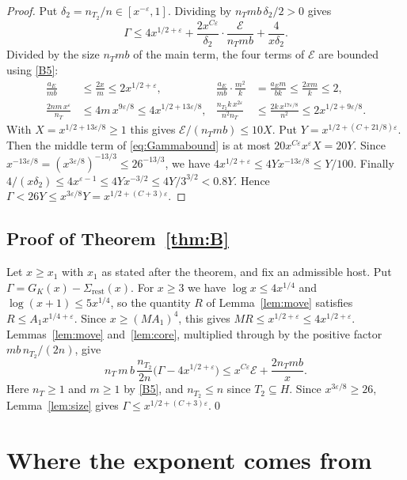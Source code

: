 \documentclass[11pt]{amsart}
\newcommand{\eps}{\varepsilon}
\theoremstyle{plain}
\theoremstyle{definition}
\numberwithin{equation}{section}
\begin{document}
\begin{proof}
Put $\delta_2=n_{T_2}/n\in[x^{-\eps},1]$. Dividing by $n_Tmb\,\delta_2/2>0$ gives
\begin{equation}\label{eq:Gammabound}
\Gamma\le4x^{1/2+\eps}+\frac{2x^{C\eps}}{\delta_2}\cdot\frac{\mathcal E}{n_Tmb}+\frac{4}{x\delta_2}.
\end{equation}
Divided by the size $n_Tmb$ of the main term, the four terms of $\mathcal E$ are bounded using
\ref{B5}:
\begin{align*}
\frac{a_E}{mb}&\le\frac{2x}{m}\le2x^{1/2+\eps}, &
\frac{a_E}{mb}\cdot\frac{m^2}{k}&=\frac{a_Em}{bk}\le\frac{2xm}{k}\le2,\\
\frac{2nm\,x^{\eps}}{n_T}&\le4m\,x^{9\eps/8}\le4x^{1/2+13\eps/8}, &
\frac{n_{T_2}k\,x^{2\eps}}{n^2n_T}&\le\frac{2k\,x^{17\eps/8}}{n^2}\le2x^{1/2+9\eps/8}.
\end{align*}
With $X=x^{1/2+13\eps/8}\ge1$ this gives $\mathcal E/(n_Tmb)\le10X$. Put
$Y=x^{1/2+(C+21/8)\eps}$. Then the middle term of \eqref{eq:Gammabound} is at most
$20x^{C\eps}x^{\eps}X=20Y$. Since $x^{-13\eps/8}=(x^{3\eps/8})^{-13/3}\le26^{-13/3}$, we have
$4x^{1/2+\eps}\le4Yx^{-13\eps/8}\le Y/100$. Finally
$4/(x\delta_2)\le4x^{\eps-1}\le4Yx^{-3/2}\le4Y/3^{3/2}<0.8Y$. Hence
$\Gamma<26Y\le x^{3\eps/8}Y=x^{1/2+(C+3)\eps}$.
\end{proof}

\subsection{Proof of Theorem~\ref{thm:B}}

Let $x\ge x_1$ with $x_1$ as stated after the theorem, and fix an admissible host. Put
$\Gamma=G_K(x)-\Sigma_{\mathrm{rest}}(x)$. For $x\ge3$ we have $\log x\le4x^{1/4}$ and
$\log(x+1)\le5x^{1/4}$, so the quantity $R$ of Lemma~\ref{lem:move} satisfies
$R\le A_1x^{1/4+\eps}$. Since $x\ge(MA_1)^4$, this gives $MR\le x^{1/2+\eps}\le4x^{1/2+\eps}$.
Lemmas~\ref{lem:move} and~\ref{lem:core}, multiplied through by the positive factor
$mb\,n_{T_2}/(2n)$, give
\[
n_T\,m\,b\,\frac{n_{T_2}}{2n}\bigl(\Gamma-4x^{1/2+\eps}\bigr)\le x^{C\eps}\mathcal E+\frac{2n_Tmb}{x}.
\]
Here $n_T\ge1$ and $m\ge1$ by \ref{B5}, and $n_{T_2}\le n$ since $T_2\subseteq H$. Since
$x^{3\eps/8}\ge26$, Lemma~\ref{lem:size} gives $\Gamma\le x^{1/2+(C+3)\eps}$.\qed
\section{Where the exponent comes from}\label{sec:balance}
\end{document}
